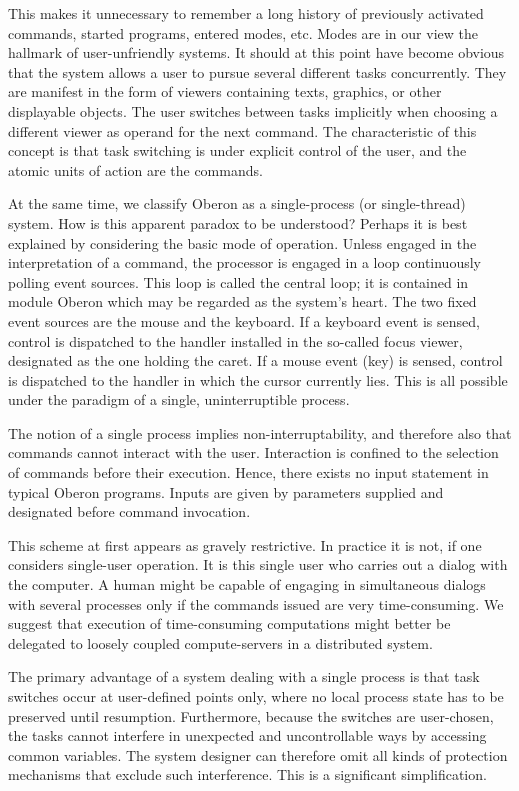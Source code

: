 This makes it unnecessary to remember a long history of previously activated commands, started
programs, entered modes, etc. Modes are in our view the hallmark of user-unfriendly systems. It
should at this point have become obvious that the system allows a user to pursue several different
tasks concurrently. They are manifest in the form of viewers containing texts, graphics, or other
displayable objects. The user switches between tasks implicitly when choosing a different viewer as
operand for the next command. The characteristic of this concept is that task switching is under
explicit control of the user, and the atomic units of action are the commands.

At the same time, we classify Oberon as a single-process (or single-thread) system. How is this
apparent paradox to be understood? Perhaps it is best explained by considering the basic mode of
operation. Unless engaged in the interpretation of a command, the processor is engaged in a loop
continuously polling event sources. This loop is called the central loop; it is contained in module
Oberon which may be regarded as the system's heart. The two fixed event sources are the mouse
and the keyboard. If a keyboard event is sensed, control is dispatched to the handler installed in the
so-called focus viewer, designated as the one holding the caret. If a mouse event (key) is sensed,
control is dispatched to the handler in which the cursor currently lies. This is all possible under the
paradigm of a single, uninterruptible process.

The notion of a single process implies non-interruptability, and therefore also that commands
cannot interact with the user. Interaction is confined to the selection of commands before their
execution. Hence, there exists no input statement in typical Oberon programs. Inputs are given by
parameters supplied and designated before command invocation.

This scheme at first appears as gravely restrictive. In practice it is not, if one considers single-user
operation. It is this single user who carries out a dialog with the computer. A human might be
capable of engaging in simultaneous dialogs with several processes only if the commands issued
are very time-consuming. We suggest that execution of time-consuming computations might better
be delegated to loosely coupled compute-servers in a distributed system.

The primary advantage of a system dealing with a single process is that task switches occur at
user-defined points only, where no local process state has to be preserved until resumption.
Furthermore, because the switches are user-chosen, the tasks cannot interfere in unexpected and
uncontrollable ways by accessing common variables. The system designer can therefore omit all
kinds of protection mechanisms that exclude such interference. This is a significant simplification.

